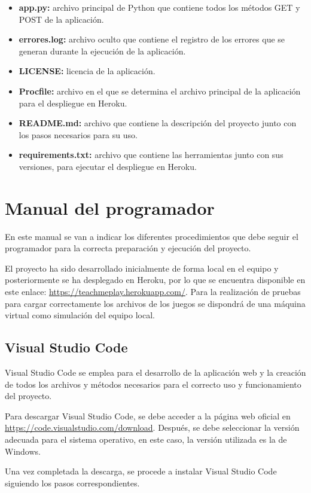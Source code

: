 \begin{itemize}
    \item \textbf{app.py:} archivo principal de Python que contiene todos los métodos GET y POST de la aplicación. 
    \item \textbf{errores.log:} archivo oculto que contiene el registro de los errores que se generan durante la ejecución de la aplicación.
    \item \textbf{LICENSE:} licencia de la aplicación.
    \item \textbf{Procfile:} archivo en el que se determina el archivo principal de la aplicación para el despliegue en Heroku. 
    \item \textbf{README.md:} archivo que contiene la descripción del proyecto junto con los pasos necesarios para su uso.
    \item \textbf{requirements.txt:} archivo que contiene las herramientas junto con sus versiones, para ejecutar el despliegue en Heroku.
   
\end{itemize}

\section{Manual del programador}
En este manual se van a indicar los diferentes procedimientos que debe seguir el programador para la correcta preparación y ejecución del proyecto.

El proyecto ha sido desarrollado inicialmente de forma local en el equipo y posteriormente se ha desplegado en Heroku, por lo que se encuentra disponible en este enlace: \url {https://teachmeplay.herokuapp.com/}. Para la realización de pruebas para cargar correctamente los archivos de los juegos se dispondrá de una máquina virtual como simulación del equipo local.

\subsection{Visual Studio Code}
Visual Studio Code se emplea para el desarrollo de la aplicación web y la creación de todos los archivos y métodos necesarios para el correcto uso y funcionamiento del proyecto.

Para descargar Visual Studio Code, se debe acceder a la página web oficial en \url{https://code.visualstudio.com/download}. Después, se debe seleccionar la versión adecuada para el sistema operativo, en este caso, la versión utilizada es la de Windows.

Una vez completada la descarga, se procede a instalar Visual Studio Code siguiendo los pasos correspondientes.

